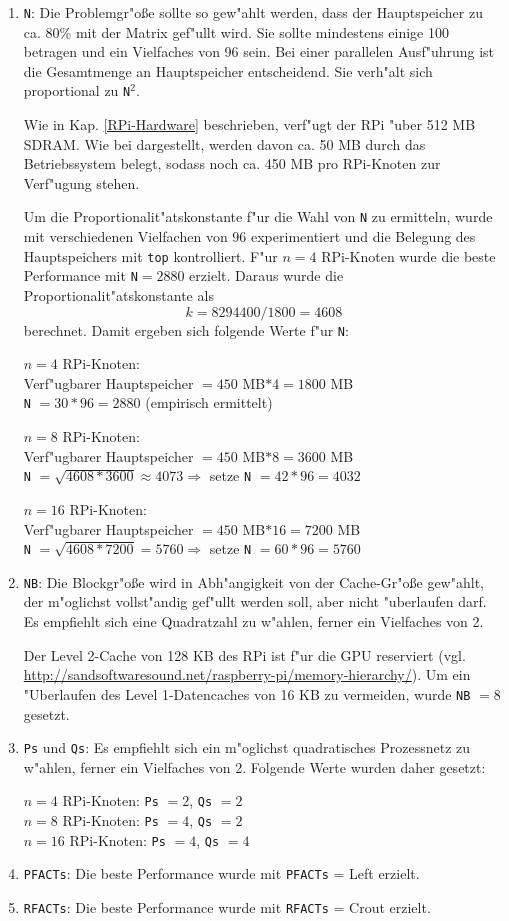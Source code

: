 \begin{enumerate} 
	\item \texttt{N}: Die Problemgr"o\ss e sollte so gew"ahlt werden, dass der Hauptspeicher zu ca. 80\% mit der Matrix gef"ullt wird. Sie sollte mindestens einige 100 betragen und ein Vielfaches von 96 sein. Bei einer parallelen Ausf"uhrung ist die Gesamtmenge an Hauptspeicher entscheidend. Sie verh"alt sich proportional zu \texttt{N}$^2$. 
	
Wie in Kap. \ref{RPi-Hardware} beschrieben, verf"ugt der RPi "uber 512 MB SDRAM. Wie bei \cite{kli13} dargestellt, werden davon ca. 50 MB durch das Betriebssystem belegt, sodass noch ca. 450 MB pro RPi-Knoten zur Verf"ugung stehen. 

Um die Proportionalit"atskonstante f"ur die Wahl von \texttt{N} zu ermitteln, wurde mit verschiedenen Vielfachen von 96 experimentiert und die Belegung des Hauptspeichers mit \texttt{top} kontrolliert. F"ur $n=4$ RPi-Knoten wurde die beste Performance mit \texttt{N}$=2880$ erzielt. Daraus wurde die Proportionalit"atskonstante als \[k=8294400/1800=4608\] berechnet. Damit ergeben sich folgende Werte f"ur \texttt{N}:

\noindent
$n=4$ RPi-Knoten:\\
Verf"ugbarer Hauptspeicher $=450$ MB$\ast 4=1800$ MB\\
\texttt{N} $=30\ast 96=2880$ (empirisch ermittelt)

$n=8$ RPi-Knoten:\\
Verf"ugbarer Hauptspeicher $=450$ MB$\ast 8=3600$ MB\\
\texttt{N} $=\sqrt{4608\ast 3600}\approx 4073\Rightarrow$ setze \texttt{N} $=42\ast 96=4032$

$n=16$ RPi-Knoten:\\
Verf"ugbarer Hauptspeicher $=450$ MB$\ast 16=7200$ MB\\
\texttt{N} $=\sqrt{4608\ast 7200}=5760\Rightarrow$ setze \texttt{N} $=60\ast 96=5760$	
	\item \texttt{NB}: Die Blockgr"o\ss e wird in Abh"angigkeit von der Cache-Gr"o\ss e gew"ahlt, der m"oglichst vollst"andig gef"ullt werden soll, aber nicht "uberlaufen darf. Es empfiehlt sich eine Quadratzahl zu w"ahlen, ferner ein Vielfaches von 2. 

Der Level 2-Cache von 128 KB des RPi ist f"ur die GPU reserviert (vgl. \url{http://sandsoftwaresound.net/raspberry-pi/memory-hierarchy/}). Um ein "Uberlaufen des Level 1-Datencaches von 16 KB zu vermeiden, wurde \texttt{NB} $= 8$ gesetzt. 
	\item \texttt{Ps} und \texttt{Qs}: Es empfiehlt sich ein m"oglichst quadratisches Prozessnetz zu w"ahlen, ferner ein Vielfaches von 2. Folgende Werte wurden daher gesetzt: 
	
$n=4$ RPi-Knoten: \texttt{Ps} $=2$, \texttt{Qs} $=2$\\ 
$n=8$ RPi-Knoten: \texttt{Ps} $=4$, \texttt{Qs} $=2$\\ 
$n=16$ RPi-Knoten: \texttt{Ps} $=4$, \texttt{Qs} $=4$
	\item \texttt{PFACTs}: Die beste Performance wurde mit \texttt{PFACTs} = Left erzielt. 
	\item \texttt{RFACTs}: Die beste Performance wurde mit \texttt{RFACTs} = Crout erzielt.
\end{enumerate}
